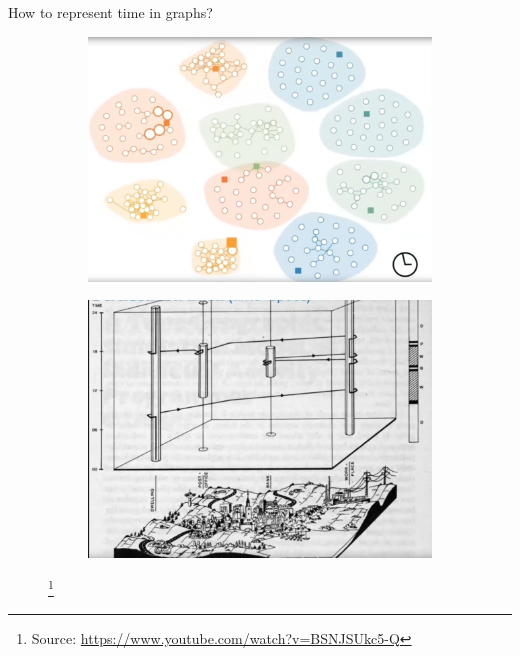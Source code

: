 \documentclass{beamer}
\newcommand{\sourcefootnote}[1]{\let\thefootnote\relax\footnote{{\tiny Source: \url{#1}}}}
\begin{document}
\begin{frame}{How to represent time in graphs?}
\begin{figure}
				\begin{subfigure}{0.42\textwidth}
						\centering
						\includegraphics[width=\textwidth]{media/temporal_sense_3.png}
				\end{subfigure}
				\hfill
				\begin{subfigure}{0.42\textwidth}
						\centering
						\includegraphics[width=\textwidth]{media/temporal_sense_4.png}
				\end{subfigure}
				\sourcefootnote{https://www.youtube.com/watch?v=BSNJSUkc5-Q}
		\end{figure}
\end{frame}
\end{document}

